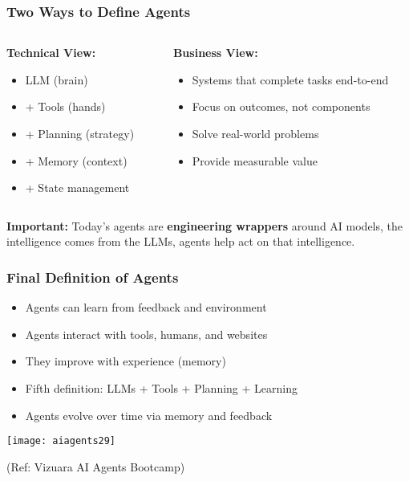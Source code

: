\begin{frame}[fragile]\frametitle{Two Ways to Define Agents}
\begin{columns}
    \begin{column}[T]{0.5\linewidth}
        \textbf{Technical View:}
        \begin{itemize}
            \item LLM (brain)
            \item + Tools (hands)
            \item + Planning (strategy)
            \item + Memory (context)
            \item + State management
        \end{itemize}
    \end{column}
    \begin{column}[T]{0.5\linewidth}
        \textbf{Business View:}
        \begin{itemize}
            \item Systems that complete tasks end-to-end
            \item Focus on outcomes, not components
            \item Solve real-world problems
            \item Provide measurable value
        \end{itemize}
    \end{column}
\end{columns}

\vspace{0.5cm}
\textbf{Important:} Today's agents are \textbf{engineering wrappers} around AI models, the intelligence comes from the LLMs, agents help act on that intelligence.
\end{frame}


\begin{frame}[fragile]\frametitle{Final Definition of Agents}

      \begin{itemize}
        \item Agents can learn from feedback and environment
        \item Agents interact with tools, humans, and websites
        \item They improve with experience (memory)
        \item Fifth definition: LLMs + Tools + Planning + Learning
        \item Agents evolve over time via memory and feedback
      \end{itemize}

		\begin{center}
		\texttt{[image: aiagents29]}
		
		{\tiny (Ref: Vizuara AI Agents Bootcamp)}
		\end{center}	

\end{frame}

